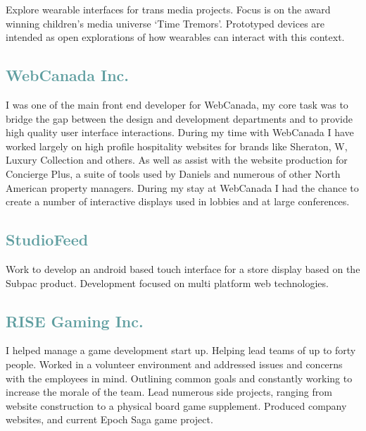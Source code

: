 Explore wearable interfaces for trans media projects. Focus is on the award winning children's media universe `Time Tremors'. Prototyped devices are intended as open explorations of how wearables can interact with this context.

\subsection{\textcolor{CadetBlue}{\LARGE{WebCanada Inc.}}}

I was one of the main front end developer for WebCanada, my core task was to bridge the gap between the design and development departments and to provide high quality user interface interactions. During my time with WebCanada I have worked largely on high profile hospitality websites for brands like Sheraton, W, Luxury Collection and others. As well as assist with the website production for Concierge Plus, a suite of tools used by Daniels and numerous of other North American property managers. During my stay at WebCanada I had the chance to create a number of interactive displays used in lobbies and at large conferences. 

\subsection{\textcolor{CadetBlue}{\LARGE{StudioFeed}}}

Work to develop an android based touch interface for a store display based on the Subpac product. Development focused on multi platform web technologies.

\subsection{\textcolor{CadetBlue}{\LARGE{RISE Gaming Inc.}}}

I helped manage a game development start up. Helping lead teams of up to forty people.
Worked in a volunteer environment and addressed issues and concerns with the employees in mind. Outlining common goals and constantly working to increase the morale of the team. Lead numerous side projects, ranging from website construction to a physical board game supplement. Produced company websites, and current Epoch Saga game project.


